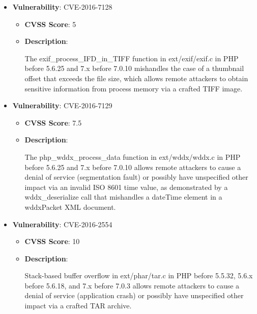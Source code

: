 \documentclass{article}
\begin{document}
\begin{itemize}
        \item \textbf{Vulnerability}: CVE-2016-7128
        \begin{itemize}
            \item \textbf{CVSS Score}:  5 
            \item \textbf{Description}:
            \parbox[t]{0.9\linewidth}{
                \ttfamily The exif\_process\_IFD\_in\_TIFF function in ext/exif/exif.c in PHP before 5.6.25 and 7.x before 7.0.10 mishandles the case of a thumbnail offset that exceeds the file size, which allows remote attackers to obtain sensitive information from process memory via a crafted TIFF image.
            }
        \end{itemize}
    
        \item \textbf{Vulnerability}: CVE-2016-7129
        \begin{itemize}
            \item \textbf{CVSS Score}:  7.5 
            \item \textbf{Description}:
            \parbox[t]{0.9\linewidth}{
                \ttfamily The php\_wddx\_process\_data function in ext/wddx/wddx.c in PHP before 5.6.25 and 7.x before 7.0.10 allows remote attackers to cause a denial of service (segmentation fault) or possibly have unspecified other impact via an invalid ISO 8601 time value, as demonstrated by a wddx\_deserialize call that mishandles a dateTime element in a wddxPacket XML document.
            }
        \end{itemize}
    
        \item \textbf{Vulnerability}: CVE-2016-2554
        \begin{itemize}
            \item \textbf{CVSS Score}:  10 
            \item \textbf{Description}:
            \parbox[t]{0.9\linewidth}{
                \ttfamily Stack-based buffer overflow in ext/phar/tar.c in PHP before 5.5.32, 5.6.x before 5.6.18, and 7.x before 7.0.3 allows remote attackers to cause a denial of service (application crash) or possibly have unspecified other impact via a crafted TAR archive.
            }
        \end{itemize}
    

\end{itemize}
\end{document}
